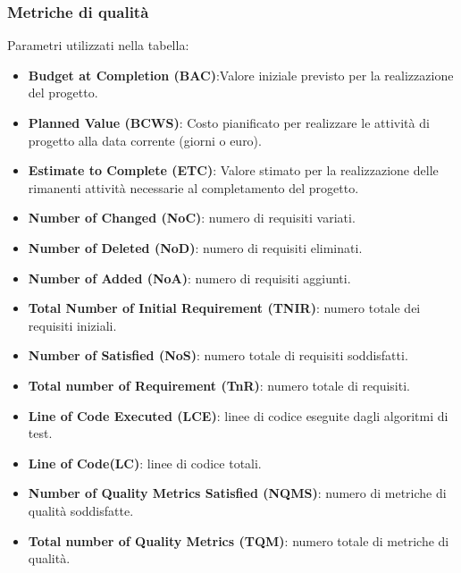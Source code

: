 \subsubsection{Metriche di qualità}
Parametri utilizzati nella tabella:
\begin{itemize}
    \item \textbf{Budget at Completion (BAC)}:Valore iniziale previsto per la realizzazione del progetto.
    \item \textbf{Planned Value (BCWS)}: Costo pianificato per realizzare le attività di progetto alla data corrente (giorni o euro).
    \item \textbf{Estimate to Complete (ETC)}: Valore stimato per la realizzazione delle rimanenti attività necessarie al completamento del progetto.
    \item \textbf{Number of Changed (NoC)}: numero di requisiti variati.
    \item \textbf{Number of Deleted (NoD)}: numero di requisiti eliminati.
    \item \textbf{Number of Added (NoA)}: numero di requisiti aggiunti.
    \item \textbf{Total Number of Initial Requirement (TNIR)}: numero totale dei requisiti iniziali.
    \item \textbf{Number of Satisfied (NoS)}: numero totale di requisiti soddisfatti.
    \item \textbf{Total number of Requirement (TnR)}: numero totale di requisiti.
    \item \textbf{Line of Code Executed (LCE)}: linee di codice eseguite dagli algoritmi di test.
    \item \textbf{Line of Code(LC)}: linee di codice totali.
    \item \textbf{Number of Quality Metrics Satisfied (NQMS)}: numero di metriche di qualità soddisfatte.
    \item \textbf{Total number of Quality Metrics (TQM)}: numero totale di metriche di qualità.
\end{itemize}

